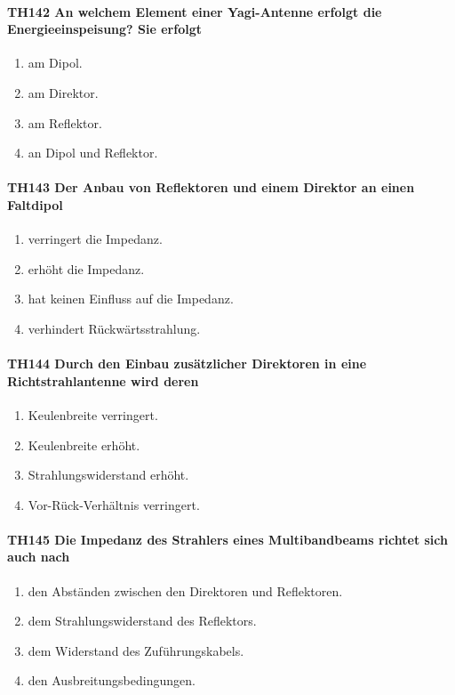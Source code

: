 \documentclass[8pt]{article}
\begin{document}
\paragraph*{TH142 An welchem Element einer Yagi-Antenne erfolgt die Energieeinspeisung? Sie erfolgt} 
\begin{enumerate}[nolistsep,label=\Alph*]
\item am Dipol.
\item am Direktor.
\item am Reflektor.
\item an Dipol und Reflektor.
\end{enumerate}

\paragraph*{TH143 Der Anbau von Reflektoren und einem Direktor an einen Faltdipol} 
\begin{enumerate}[nolistsep,label=\Alph*]
\item verringert die Impedanz.
\item erhöht die Impedanz.
\item hat keinen Einfluss auf die Impedanz.
\item verhindert Rückwärtsstrahlung.
\end{enumerate}

\paragraph*{TH144 Durch den Einbau zusätzlicher Direktoren in eine Richtstrahlantenne wird deren} 
\begin{enumerate}[nolistsep,label=\Alph*]
\item Keulenbreite verringert.
\item Keulenbreite erhöht.
\item Strahlungswiderstand erhöht.
\item Vor-Rück-Verhältnis verringert.
\end{enumerate}

\paragraph*{TH145 Die Impedanz des Strahlers eines Multibandbeams richtet sich auch nach}
\begin{enumerate}[nolistsep,label=\Alph*]
\item den Abständen zwischen den Direktoren und Reflektoren.
\item dem Strahlungswiderstand des Reflektors.
\item dem Widerstand des Zuführungskabels.
\item den Ausbreitungsbedingungen.
\end{enumerate}
\end{document}
